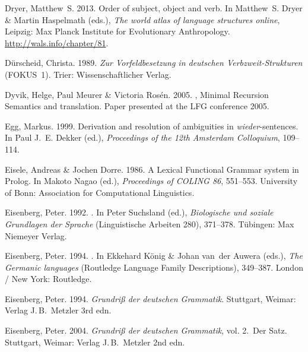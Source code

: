 \begin{thebibliography}{1420}
Dryer, Matthew~S. 2013{}.
\newblock Order of subject, object and verb.
\newblock In Matthew~S. Dryer \& Martin Haspelmath (eds.), \emph{The world
  atlas of language structures online}, Leipzig: Max Planck Institute for
  Evolutionary Anthropology.
\newblock \urlprefix\url{http://wals.info/chapter/81}.

D{\"u}rscheid, Christa. 1989.
\newblock \emph{{Zur Vorfeldbesetzung in deutschen Verbzweit-Strukturen}}
  (FOKUS~1).
\newblock Trier: Wissenschaftlicher Verlag.

Dyvik, Helge, Paul Meurer \& Victoria Ros{\'e}n. 2005.
, {Minimal Recursion Semantics} and translation.
\newblock Paper presented at the {LFG} conference 2005.

Egg, Markus. 1999.
\newblock Derivation and resolution of ambiguities in \emph{wieder}-sentences.
\newblock In Paul J.~E. Dekker (ed.), \emph{Proceedings of the {12th Amsterdam
  Colloquium}}, 109--114.

Eisele, Andreas \& Jochen Dorre. 1986.
\newblock A {Lexical Functional Grammar} system in {Prolog}.
\newblock In Makoto Nagao (ed.), \emph{Proceedings of {COLING} 86}, 551--553.
  University of Bonn: Association for Computational Linguistics.

Eisenberg, Peter. 1992.
.
\newblock In Peter Suchsland (ed.), \emph{{Biologische und soziale Grundlagen
  der Sprache}} (Linguistische Arbeiten 280), 371--378. T{\"u}bingen: Max
  Niemeyer Verlag.

Eisenberg, Peter. 1994{}.
.
\newblock In Ekkehard K{\"o}nig \& Johan van~der Auwera (eds.), \emph{The
  {Germanic} languages}  (Routledge Language Family Descriptions), 349--387.
  London / New York: Routledge.

Eisenberg, Peter. 1994{}.
\newblock \emph{{Grundri{\ss} der deutschen Grammatik}}.
\newblock Stuttgart, Weimar: Verlag J.\,B.\ Metzler 3rd edn.

Eisenberg, Peter. 2004.
\newblock \emph{{Grundri{\ss} der deutschen Grammatik}}, vol. 2.\ {Der Satz}.
\newblock Stuttgart, Weimar: Verlag J.\,B.\ Metzler 2nd edn.


\end{thebibliography}
